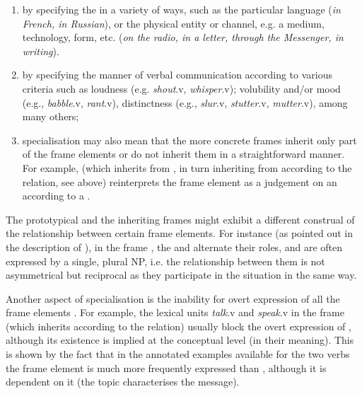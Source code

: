 \documentclass[output=paper,colorlinks,citecolor=brown]{langscibook}
\begin{document}
\begin{enumerate}[label=(\roman*)]
\item by specifying the  in a variety of ways, such as the particular language (\textit{in French, in Russian}), or the physical entity or channel, e.g. a medium, technology, form, etc. (\textit{on the radio, in a letter, through the Messenger, in writing}). 
\item by specifying the manner of verbal communication according to various criteria such as loudness (e.g. \textit{shout}.v, \textit{whisper}.v); volubility and/or mood (e.g., \textit{babble}.v, \textit{rant}.v), distinctness (e.g., \textit{slur}.v, \textit{stutter}.v, \textit{mutter}.v), among many others;
\item specialisation may also mean that the more concrete frames inherit only part of the  frame elements or do not inherit them in a straightforward manner. For example,  (which inherits from , in turn inheriting from  according to the  relation, see  above) reinterprets the frame element  as a judgement on an  according to a .
\end{enumerate}

The prototypical and the inheriting frames might exhibit a different construal of the relationship between certain frame elements. For instance (as pointed out in the description of ), in the frame , the  and  alternate their roles, and are often expressed by a single, plural NP, i.e. the relationship between them is not asymmetrical but reciprocal as they participate in the situation in the same way.

Another aspect of specialisation is the inability for overt expression of all the frame elements \citep[16]{Johnson2001}. For example, the lexical units \textit{talk}.v and \textit{speak}.v in the  frame (which inherits  according to the  relation) usually block the overt expression of , although its existence is implied at the conceptual level (in their meaning). This is shown by the fact that in the annotated examples available for the two verbs the frame element  is much more frequently expressed than , although it is dependent on it (the topic characterises the message).
\end{document}
